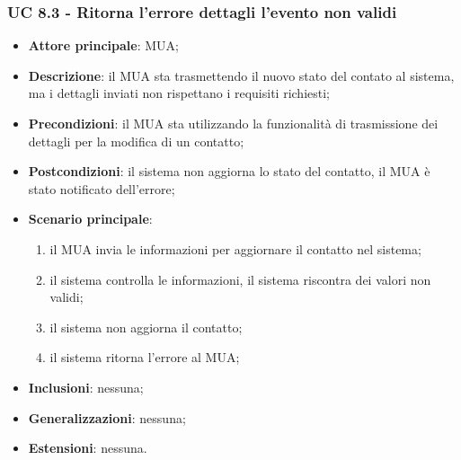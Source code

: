 \subsubsection{UC 8.3 - Ritorna l'errore dettagli l'evento non validi} \label{sec:UC8.3}
    \begin{itemize}
        \item \textbf{Attore principale}: MUA;
        \item \textbf{Descrizione}: il MUA sta trasmettendo il nuovo stato del contato al sistema, ma i dettagli inviati non rispettano i requisiti richiesti;
        \item \textbf{Precondizioni}: il MUA sta utilizzando la funzionalità di trasmissione dei dettagli per la modifica di un contatto;
        \item \textbf{Postcondizioni}: il sistema non aggiorna lo stato del contatto, il MUA è stato notificato dell'errore;
        \item \textbf{Scenario principale}:
            \begin{enumerate}
                \item il MUA invia le informazioni per aggiornare il contatto nel sistema;
                \item il sistema controlla le informazioni, il sistema riscontra dei valori non validi;
                \item il sistema non aggiorna il contatto;
                \item il sistema ritorna l'errore al MUA;
            \end{enumerate}
        \item \textbf{Inclusioni}: nessuna;
        \item \textbf{Generalizzazioni}: nessuna;
        \item \textbf{Estensioni}: nessuna.
    \end{itemize}